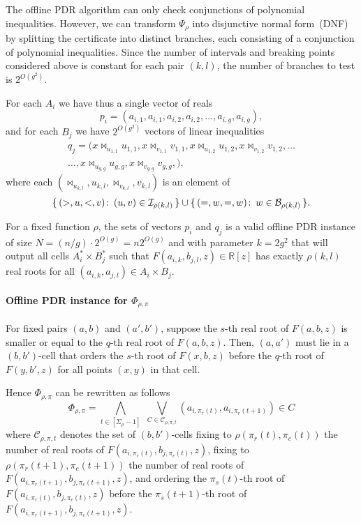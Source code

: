 The offline PDR algorithm can only check conjunctions of polynomial inequalities.
However, we can transform $\Psi_{\rho}$ into disjunctive normal form~(DNF) by
splitting the certificate into distinct branches, each consisting of a
conjunction of polynomial inequalities.
Since the number of intervals and breaking points
considered above is constant for each pair $(k,l)$, the number of branches to
test is $2^{O(g^2)}$.

For each $A_i$ we have thus a single vector of reals
\begin{displaymath}
	p_i = (
		a_{i,1} , a_{i,1},
		a_{i,2}, a_{i,2},
		\ldots,
		a_{i,g} , a_{i,g}
	),
\end{displaymath}
and for each $B_j$ we have $2^{O(g^2)}$ vectors of linear inequalities
\begin{multline*}
	q_j = (
		x \bowtie_{u_{1,1}} u_{1,1}, x \bowtie_{v_{1,1}} v_{1,1},
		x \bowtie_{u_{1,2}} u_{1,2}, x \bowtie_{v_{1,2}} v_{1,2},
		\ldots \\
		\ldots ,
		x \bowtie_{u_{g,g}} u_{g,g}, x \bowtie_{v_{g,g}} v_{g,g},
	),
\end{multline*}
where each $(\bowtie_{u_{k,l}}, u_{k,l}, \bowtie_{v_{k,l}}, v_{k,l})$ is an element of
\begin{displaymath}
	\{\, ( > , u , < , v ) \colon\, (u,v) \in \mathcal{I}_{\rho(k,l)}\,\}
	\cup
	\{\, ( = , w , = , w ) \colon\, w \in \mathcal{B}_{\rho(k,l)}\,\}.
\end{displaymath}

For a fixed function $\rho$,
the sets of vectors $p_i$ and $q_j$ is a valid offline PDR instance
of size $N = (n/g) \cdot 2^{O(g)} = n2^{O(g)}$ and with parameter $k = 2g^2$
that will
output all cells $A^*_i \times B^*_j$ such that $F(a_{i,k},b_{j,l},z) \in
\mathbb{R}[z]$ has exactly $\rho(k,l)$ real roots for all $(a_{i,k},a_{j,l}) \in A_i
\times B_j$.

\paragraph{Offline PDR instance for $\Phi_{\rho,\pi}$}

For fixed pairs $(a,b)$ and $(a',b')$, suppose the $s$-th real root of
$F(a,b,z)$ is smaller or equal to the $q$-th real root of $F(a,b,z)$. Then,
$(a,a')$ must lie in a $(b,b')$-cell that orders the $s$-th root of $F(x,b,z)$
before the $q$-th root of $F(y,b',z)$ for all points $(x,y)$ in that cell.

Hence $\Phi_{\rho,\pi}$ can be rewritten as follows
\begin{displaymath}
	\Phi_{\rho,\pi} =
	\bigwedge_{t\in[\Sigma_\rho-1]}\,\,
	\bigvee_{C \in \mathcal{C}_{\rho,\pi,t}}
	( a_{i,\pi_r(t)}, a_{i,\pi_r(t+1)} ) \in C
\end{displaymath}
where $\mathcal{C}_{\rho,\pi,t}$ denotes the set of $(b,b')$-cells
fixing to $\rho(\pi_r(t),\pi_c(t))$ the number of real roots of
$F(a_{i,\pi_r(t)},b_{j,\pi_c(t)},z)$,
fixing to $\rho(\pi_r(t+1), \pi_c(t+1))$
the number of real roots of $F(a_{i,\pi_r(t+1)},b_{j,\pi_c(t+1)},z)$,
and ordering the $\pi_s(t)$-th root of $F(a_{i,\pi_r(t)},b_{j,\pi_c(t)},z)$
before the $\pi_s(t+1)$-th root of $F(a_{i,\pi_r(t+1)},b_{j,\pi_c(t+1)},z)$.

